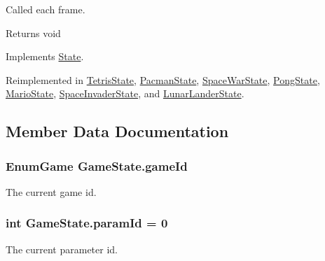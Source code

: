 Called each frame.

\begin{DoxyReturn}{Returns}
void
\end{DoxyReturn}


Implements \hyperlink{class_state_a953d2122c47b590fd72a4be8a98124f9}{State}.



Reimplemented in \hyperlink{class_tetris_state_aa522101ff32603e24c232141799ef6f1}{Tetris\-State}, \hyperlink{class_pacman_state_a7a5922c97a9ccb7380094ef02f3d1022}{Pacman\-State}, \hyperlink{class_space_war_state_a1359aae13f67fb97de75307349b8ee81}{Space\-War\-State}, \hyperlink{class_pong_state_aab539dacd758f2c5a55e24e6eb388ed4}{Pong\-State}, \hyperlink{class_mario_state_a329bb4d1bfbb5bbbfdbda5840e591d39}{Mario\-State}, \hyperlink{class_space_invader_state_a2514e1cc361e663348bf190bacda343f}{Space\-Invader\-State}, and \hyperlink{class_lunar_lander_state_ac266f36c49863e79753fb87d2498f32d}{Lunar\-Lander\-State}.



\subsection{Member Data Documentation}
\hypertarget{class_game_state_ad7d6224b63a573579b940b0767e996b4}{
\subsubsection[{game\-Id}]{\setlength{\rightskip}{0pt plus 5cm}Enum\-Game Game\-State.\-game\-Id\hspace{0.3cm}{\ttfamily [protected]}}}\label{class_game_state_ad7d6224b63a573579b940b0767e996b4}


The current game id.

\hypertarget{class_game_state_abac5b81af203197b6e336ef57dd1e6f1}{
\subsubsection[{param\-Id}]{\setlength{\rightskip}{0pt plus 5cm}int Game\-State.\-param\-Id = 0\hspace{0.3cm}{\ttfamily [protected]}}}\label{class_game_state_abac5b81af203197b6e336ef57dd1e6f1}


The current parameter id.


